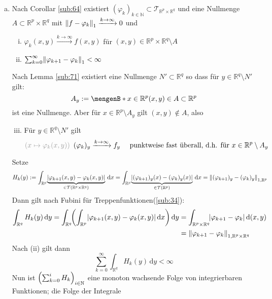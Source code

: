 \begin{enumerate}[a)]
	\item Nach Corollar \ref{sub:64} existiert $(\varphi_k)_{k \in \mathds{N}} \subset \mathcal{T}_{\mathds{R}^p \times \mathds{R}^q}$ und eine Nullmenge 
	$A \subset \mathds{R}^p \times \mathds{R}^q$ mit $\norm[1]{f- \varphi_k} \xrightarrow{k \to \infty} 0 $ und 
	\begin{enumerate}[(i)]
		\item $\varphi_k(x,y) \xrightarrow{k \to \infty} f(x,y)$ für $(x,y) \in \mathds{R}^p \times \mathds{R}^q \setminus A$
		\item $ \sum_{k=0}^{\infty} \norm[1]{\varphi_{k+1} - \varphi_k} < \infty $
	\end{enumerate}
	Nach Lemma \ref{sub:71} existiert eine Nullmenge $N' \subset \mathds{R}^q$ so dass für $y \in \mathds{R}^q\setminus N'$ gilt:
	\[
		A_y := \set[x \in \mathds{R}^p]{(x,y) \in A} \subset \mathds{R}^p 
	\]
	ist eine Nullmenge. Aber für $x \in \mathds{R}^p \setminus A_y$ gilt $(x,y) \not\in A$, also 
	\begin{enumerate}[(i)]
		\setcounter{enumii}{2}
		\item Für $y \in \mathds{R}^q \setminus N'$ gilt
		\[
			{\color{light_gray}(x \mapsto \varphi_k (x,y) )} \enspace(\varphi_k)_y \xrightarrow{k \to \infty} f_y \quad \text{ punktweise fast überall, d.h. für } x \in 
			\mathds{R}^p \setminus A_y
		\]
	\end{enumerate}
	Setze 
	\[
		H_k(y) := \int_{\mathds{R}^p}\! \underbrace{\abs*{\varphi_{k+1}(x,y) - \varphi_k(x,y)}}_{\in \mathcal{T}(\mathds{R}^p \times \mathds{R}^q)}  \, \mathrm{d}x   
		= \int_{\mathds{R}^p}\! \underbrace{\abs*{(\varphi_{k+1})_y (x) - 
		(\varphi_k)_y (x)}}_{\in \mathcal{T}(\mathds{R}^p)}  \, \mathrm{d}x  = \norm[1,\mathds{R}^p]{(\varphi_{k+1})_y - (\varphi_k)_y} 
	\]
	Dann gilt nach Fubini für Treppenfunktionen(\ref{sub:34}):
	\begin{align*}
		\int_{\mathds{R}^q} H_k(y)  \, \mathrm{d}y = \int_{\mathds{R}^q}\! \enbrace*{\int_{\mathds{R}^p} \abs*{\varphi_{k+1} (x,y)- \varphi_k(x,y)}  \, \mathrm{d}x  }  
		\, \mathrm{d}y &= \int_{\mathds{R}^p \times \mathds{R}^q}\! \abs*{\varphi_{k+1} - \varphi_k}  \, \mathrm{d}(x,y)\\
		&= \norm[1,\mathds{R}^p \times \mathds{R}^q]{\varphi_{k+1} - \varphi_k}
	\end{align*}
	Nach (ii) gilt dann
	\[
		\sum_{k=0}^{\infty} \int_{\mathds{R}^q}\! H_k(y)  \, \mathrm{d}y < \infty \tag{$\star$}
	\]
	Nun ist $\enbrace*{\sum_{k=0}^{i} H_k}_{i \in \mathds{N}}$ eine monoton wachsende Folge von integrierbaren Funktionen; die Folge der Integrale 

\end{enumerate}
